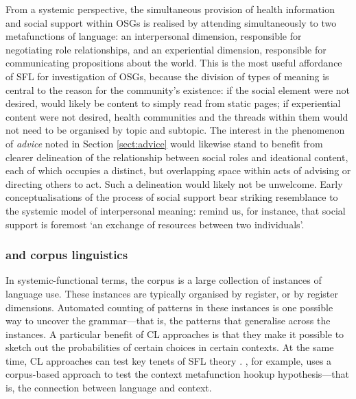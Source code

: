 From a systemic perspective, the simultaneous provision of health information and social support within \glspl{OSG} is realised by  attending simultaneously to two metafunctions of language: an interpersonal dimension, responsible for negotiating role relationships, and an experiential dimension, responsible for communicating propositions about the world. This is the most useful affordance of \gls{SFL} for investigation of \glspl{OSG}, because the division of types of meaning is central to the reason for the community's existence: if the social element were not desired,  would likely be content to simply read from static pages; if experiential content were not desired, health communities and the threads within them would not need to be organised by topic and subtopic. The interest in the phenomenon of \emph{advice} noted in Section \ref{sect:advice} would likewise stand to benefit from clearer delineation of the relationship between social roles and ideational content, each of which occupies a distinct, but overlapping space within acts of advising or directing others to act. Such a delineation would likely not be unwelcome. Early conceptualisations of the process of social support bear striking resemblance to the systemic model of interpersonal meaning: \textcite[p.~11]{shumaker1984toward} remind us, for instance, that social support is foremost `an exchange of resources between two individuals'.

\subsubsection{ and corpus linguistics}

In systemic\hyp{}functional terms, the \gls{corpus} is a large collection of instances of language use. These instances are typically organised by register, or by register dimensions. Automated counting of patterns in these instances is one possible way to uncover the grammar---that is, the patterns that generalise across the instances. A particular benefit of \gls{CL} approaches is that they make it possible to sketch out the probabilities of certain choices in certain contexts. At the same time, \gls{CL} approaches can test key tenets of \gls{SFL} theory \cite{honnibal_creating_2007}. \textcite{clarke_patterns_2012}, for example, uses a corpus-based approach to test the context metafunction hookup hypothesis---that is, the connection between language and context.

